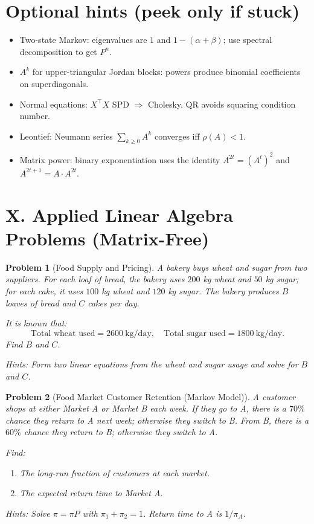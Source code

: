 \documentclass[11pt]{article}
\theoremstyle{upright}
\newtheorem{problem}{Problem}
\begin{document}
\section*{Optional hints (peek only if stuck)}
\begin{itemize}
\item Two-state Markov: eigenvalues are $1$ and $1-(\alpha+\beta)$; use spectral decomposition to get $P^n$.
\item $A^k$ for upper-triangular Jordan blocks: powers produce binomial coefficients on superdiagonals.
\item Normal equations: $X^\top X$ SPD $\Rightarrow$ Cholesky. QR avoids squaring condition number.
\item Leontief: Neumann series $\sum_{k\ge0}A^k$ converges iff $\rho(A)<1$.
\item Matrix power: binary exponentiation uses the identity $A^{2t}=(A^t)^2$ and $A^{2t+1}=A\cdot A^{2t}$.
\end{itemize}
\section*{X. Applied Linear Algebra Problems (Matrix-Free)}

\begin{problem}[Food Supply and Pricing]
A bakery buys wheat and sugar from two suppliers. For each loaf of bread, the bakery uses $200$ kg wheat and $50$ kg sugar; for each cake, it uses $100$ kg wheat and $120$ kg sugar. The bakery produces $B$ loaves of bread and $C$ cakes per day.

It is known that:
\[
\text{Total wheat used} = 2600 \ \mathrm{kg/day}, \quad
\text{Total sugar used} = 1800 \ \mathrm{kg/day}.
\]
Find $B$ and $C$.

\textit{Hints:}  
Form two linear equations from the wheat and sugar usage and solve for $B$ and $C$.
\end{problem}

\begin{problem}[Food Market Customer Retention (Markov Model)]
A customer shops at either Market A or Market B each week. If they go to A, there is a $70\%$ chance they return to A next week; otherwise they switch to B. From B, there is a $60\%$ chance they return to B; otherwise they switch to A.

Find:
\begin{enumerate}
    \item The long-run fraction of customers at each market.
    \item The expected return time to Market A.
\end{enumerate}

\textit{Hints:}  
Solve $\pi = \pi P$ with $\pi_1 + \pi_2 = 1$. Return time to A is $1/\pi_A$.
\end{problem}
\end{document}
